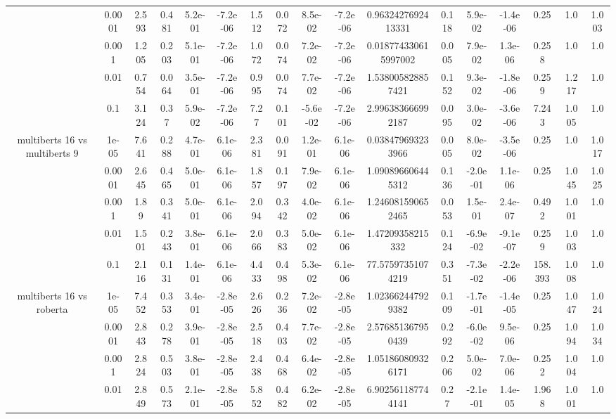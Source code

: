 \begin{tabular}{|c|c|c|c|c|c|c|c|c|c|c|c|c|c|c|c|c|}
 & 0.0001 & 2.593 & 0.481 & 5.2e-01 & -7.2e-06 & 1.512 & 0.072 & 8.5e-02 & -7.2e-06 & 0.9632427692413331 & 0.118 & 5.9e-02 & -1.4e-06 & 0.25 & 1.0 & 1.003 \\
 & 0.001 & 1.205 & 0.203 & 5.1e-01 & -7.2e-06 & 1.072 & 0.074 & 7.2e-02 & -7.2e-06 & 0.018774330615997002 & 0.005 & 7.9e-02 & 1.3e-06 & 0.258 & 1.0 & 1.0 \\
 & 0.01 & 0.754 & 0.064 & 3.5e-01 & -7.2e-06 & 0.995 & 0.074 & 7.7e-02 & -7.2e-06 & 1.538005828857421 & 0.152 & 9.3e-02 & -1.8e-06 & 0.259 & 1.217 & 1.0 \\
 & 0.1 & 3.124 & 0.37 & 5.9e-02 & -7.2e-06 & 7.27 & 0.101 & -5.6e-02 & -7.2e-06 & 2.996383666992187 & 0.095 & 3.0e-02 & -3.6e-06 & 7.243 & 1.005 & 1.0 \\
\hline
\multirow{5}{*}{multiberts 16 vs multiberts 9} & 1e-05 & 7.641 & 0.288 & 4.7e-01 & 6.1e-06 & 2.381 & 0.091 & 1.2e-01 & 6.1e-06 & 0.038479693233966 & 0.005 & 8.0e-02 & -3.5e-06 & 0.25 & 1.0 & 1.017 \\
 & 0.0001 & 2.645 & 0.465 & 5.0e-01 & 6.1e-06 & 1.857 & 0.197 & 7.9e-02 & 6.1e-06 & 1.090896606445312 & 0.136 & -2.0e-01 & 1.1e-06 & 0.25 & 1.045 & 1.025 \\
 & 0.001 & 1.89 & 0.341 & 5.0e-01 & 6.1e-06 & 2.094 & 0.342 & 4.0e-02 & 6.1e-06 & 1.246081590652465 & 0.053 & 1.5e-01 & 2.4e-07 & 0.492 & 1.001 & 1.0 \\
 & 0.01 & 1.501 & 0.243 & 3.8e-01 & 6.1e-06 & 2.066 & 0.383 & 5.0e-02 & 6.1e-06 & 1.47209358215332 & 0.124 & -6.9e-02 & -9.1e-07 & 0.259 & 1.003 & 1.0 \\
 & 0.1 & 2.116 & 0.131 & 1.4e-01 & 6.1e-06 & 4.433 & 0.498 & 5.3e-02 & 6.1e-06 & 77.57597351074219 & 0.351 & -7.3e-02 & -2.2e-06 & 158.393 & 1.008 & 1.0 \\
\hline
\multirow{5}{*}{multiberts 16 vs roberta } & 1e-05 & 7.452 & 0.353 & 3.4e-01 & -2.8e-05 & 2.626 & 0.236 & 7.2e-02 & -2.8e-05 & 1.023662447929382 & 0.109 & -1.7e-01 & -1.4e-05 & 0.25 & 1.047 & 1.024 \\
 & 0.0001 & 2.843 & 0.278 & 3.9e-01 & -2.8e-05 & 2.518 & 0.403 & 7.7e-02 & -2.8e-05 & 2.576851367950439 & 0.292 & -6.0e-02 & 9.5e-06 & 0.25 & 1.094 & 1.034 \\
 & 0.001 & 2.824 & 0.503 & 3.8e-01 & -2.8e-05 & 2.438 & 0.468 & 6.4e-02 & -2.8e-05 & 1.051860809326171 & 0.206 & 5.0e-02 & 7.0e-06 & 0.252 & 1.004 & 1.0 \\
 & 0.01 & 2.849 & 0.573 & 2.1e-01 & -2.8e-05 & 5.852 & 0.482 & 6.2e-02 & -2.8e-05 & 6.902561187744141 & 0.27 & -2.1e-01 & 1.4e-05 & 1.968 & 1.001 & 1.0 \\

\end{tabular}
